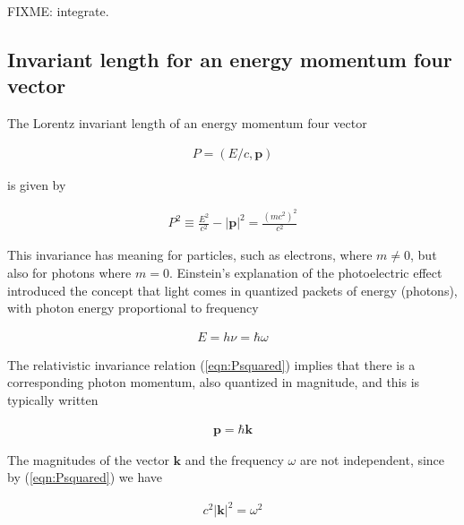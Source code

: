\documentclass[]{eliblog}
\newcommand{\Abs}[1]{{\left\lvert{#1}\right\rvert}}
\newcommand{\BB}[0]{\mathbf{B}}
\newcommand{\BE}[0]{\mathbf{E}}
\newcommand{\Bk}[0]{\mathbf{k}}
\newcommand{\Bp}[0]{\mathbf{p}}
\newcommand{\cross}[0]{\times}
\begin{document}
FIXME: integrate.
\subsection{Invariant length for an energy momentum four vector}

The Lorentz invariant length of an energy momentum four vector

\begin{align}
P = (E/c, \Bp)
\end{align}

is given by

\begin{align}\label{eqn:Psquared}
P^2 \equiv \frac{E^2}{c^2} - \Abs{\Bp}^2 = \frac{(m c^2)^2}{c^2}
\end{align}

This invariance has meaning for particles, such as electrons, where $m \ne 0$, but also for photons where $m = 0$.
Einstein's explanation of the photoelectric effect introduced the concept that light comes in
quantized packets of energy (photons), with photon energy proportional to frequency

\begin{align}
E = h \nu = \hbar \omega
\end{align}

The relativistic invariance relation (\ref{eqn:Psquared}) implies that there is a corresponding photon momentum, also
quantized in magnitude, and this is typically written

\begin{align}
\Bp = \hbar \Bk
\end{align}

The magnitudes of the vector $\Bk$ and the frequency $\omega$ are not independent, since by (\ref{eqn:Psquared}) we have

\begin{align}\label{eqn:omegaKsquared}
c^2 \Abs{\Bk}^2 = \omega^2
\end{align}

%
%
%
\end{document}
